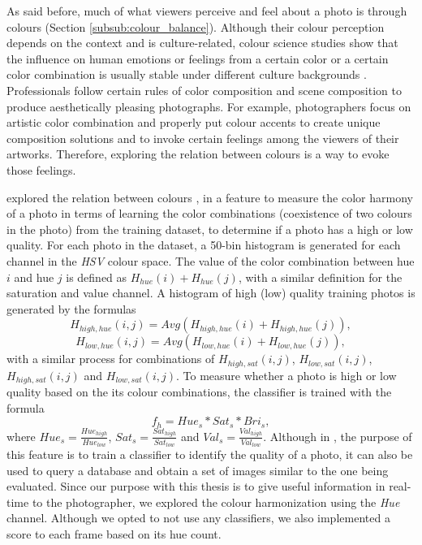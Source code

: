 As said before, much of what viewers perceive and feel about a photo is through colours (Section \ref{subsub:colour_balance}). Although their colour perception depends on the context and is culture-related, colour science studies show that the influence on human emotions or feelings from a certain color or a certain color combination is usually stable under different culture backgrounds \cite{manav2007color}.
Professionals follow certain rules of color composition and scene composition to produce aesthetically pleasing photographs. For example, photographers focus on artistic color combination and properly put colour accents to create unique composition solutions and to invoke certain feelings among the viewers of their artworks. Therefore, exploring the relation between colours is a way to evoke those feelings.

\citeauthor{luo2008photo} explored the relation between colours \cite{luo2008photo}, in a feature to measure the color harmony of a photo in terms of learning the color combinations (coexistence of two colours in the photo) from the training dataset, to determine if a photo has a high or low quality.
For each photo in the dataset, a 50-bin histogram is generated for each channel in the \emph{HSV} colour space. The value of the color combination between hue $i$ and hue $j$ is defined as $H_{hue}(i) + H_{hue}(j)$, with a similar definition for the saturation and value channel. A histogram of high (low) quality training photos is generated by the formulas
\begin{equation}
H_{high,hue}(i,j) = Avg(H_{high,hue}(i)+H_{high,hue}(j)),
\end{equation}
\begin{equation}
H_{low,hue}(i,j) = Avg(H_{low,hue}(i)+H_{low,hue}(j)),
\end{equation}
with a similar process for combinations of $H_{high,sat}(i,j)$, $H_{low,sat}(i,j)$, $H_{high,sat}(i,j)$ and $H_{low,sat}(i,j)$.
To measure whether a photo is high or low quality based on the its colour combinations, the classifier is trained with the formula
\begin{equation}
f_{h} = Hue_{s}*Sat_{s}*Bri_{s},
\end{equation}
where $Hue_{s} = \frac{Hue_{high}}{Hue_{low}}$, $Sat_{s} = \frac{Sat_{high}}{Sat_{low}}$ and $Val_{s} = \frac{Val_{high}}{Val_{low}}$.
Although in \cite{luo2008photo}, the purpose of this feature is to train a classifier to identify the quality of a photo, it can also be used to query a database and obtain a set of images similar to the one being evaluated. Since our purpose with this thesis is to give useful information in real-time to the photographer, we explored the colour harmonization using the \emph{Hue} channel. Although we opted to not use any classifiers, we also implemented a score to each frame based on its hue count.

